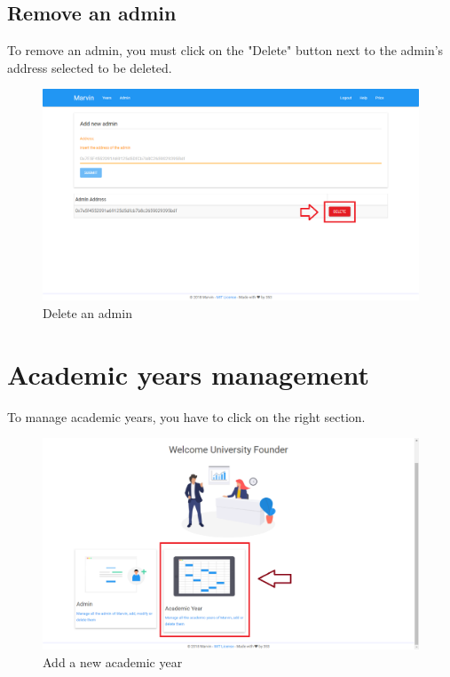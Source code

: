 \documentclass[ManualeUtente]{subfiles}
\begin{document}
\subsection{Remove an admin}
To remove an admin, you must click on the "Delete" button next to the admin's address selected to be deleted.
\begin{figure}[H]
	\centering
	\includegraphics[width=0.7\linewidth]{image/DeleteAdmin}
	\caption[Delete admin]{Delete an admin}
	\label{fig:universityaddamin}
\end{figure}
\newpage

\section{Academic years management}
To manage academic years, you have to click on the right section.
\begin{figure}[H]
	\centering
	\includegraphics[width=0.7\linewidth]{image/UniAcademicYear}
	\caption[Add year]{Add a new academic year}
	\label{fig:universityaddamin}
\end{figure}
\end{document}
